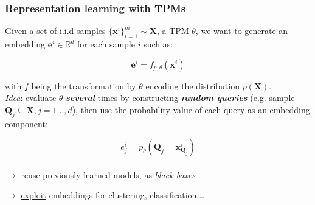 \documentclass[xcolor={usenames,dvipsnames,svgnames}, compress]{beamer}
\begin{document}
\begin{frame}[t]
  \small
  \frametitle{Representation learning with TPMs}
  
  Given a set of i.i.d samples $\{\mathbf x^i\}_{i=1}^m\sim
  \mathbf{X}$,  a TPM $\theta$,  we want to generate an embedding
  $\mathbf{e}^{i}\in\mathbb{R}^{d}$ for
  each sample $i$ such as:
  
  $$\mathbf{e}^{i}=f_{p,\theta}(\mathbf{x}^{i})$$
  
  with $f$ being the transformation by $\theta$
  encoding the distribution $p(\mathbf{X})$.\\[10pt]
  
  \emph{Idea}: evaluate $\theta$ \emph{\textbf{several}} times by constructing \emph{\textbf{random
    queries}} (e.g. sample $\mathbf{Q}_{j} \subseteq \mathbf{X}, j =
  1\dots,d$),
  then use the probability value of each query as an embedding component:
  
  $$e_{j}^{i}=p_{\theta}(\mathbf{Q}_{j}=\mathbf{x}^{i}_{\mathbf{Q}_{j}})$$\\[10pt]

  $\rightarrow$ \underline{reuse} previously learned models, as \emph{black boxes}\par
  $\rightarrow$ \underline{exploit} embeddings for clustering, classification,\dots
  
  
\end{frame}
\end{document}
